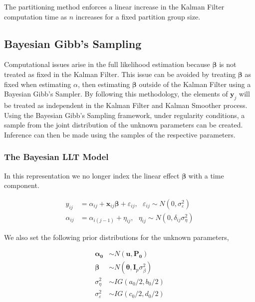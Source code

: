 \documentclass[
]{article}
\begin{document}
The partitioning method enforces a linear increase in the Kalman Filter computation time as \(n\) increases for a fixed partition group size.

\hypertarget{bayesian-gibbs-sampling}{%
\subsection{Bayesian Gibb's Sampling}\label{bayesian-gibbs-sampling}}

Computational issues arise in the full likelihood estimation because \(\boldsymbol{\beta}\) is not treated as fixed in the Kalman Filter. This issue can be avoided by treating \(\boldsymbol{\beta}\) as fixed when estimating \(\alpha\), then estimating \(\boldsymbol{\beta}\) outside of the Kalman Filter using a Bayesian Gibb's Sampler. By following this methodology, the elements of \(\boldsymbol{y}_j\) will be treated as independent in the Kalman Filter and Kalman Smoother process. Using the Bayesian Gibb's Sampling framework, under regularity conditions, a sample from the joint distribution of the unknown parameters can be created. Inference can then be made using the samples of the respective parameters.

\hypertarget{the-bayesian-llt-model}{%
\subsubsection{The Bayesian LLT Model}\label{the-bayesian-llt-model}}

In this representation we no longer index the linear effect \(\boldsymbol{\beta}\) with a time component.

\begin{equation*}
\begin{aligned}
y_{ij} &= \alpha_{ij} + \boldsymbol{x}_{ij} \boldsymbol{\beta} +\varepsilon_{ij}, \ \ \ \varepsilon_{ij} \sim N(0, \sigma^2_\varepsilon)\\
\alpha_{ij} &= \alpha_{i(j-1)} + \eta_{ij}, \ \ \ \eta_{ij}\sim N(0, \delta_{ij}\sigma^2_\eta) 
\end{aligned}
\end{equation*}

We also set the following prior distributions for the unknown parameters,

\begin{equation*}
\begin{aligned}
\boldsymbol{\alpha_0} &\sim N(\boldsymbol{u}, \boldsymbol{P_0})\\
\boldsymbol{\beta} &\sim N(\boldsymbol{\theta}, \boldsymbol{I}_p\sigma^2_\beta)\\
\sigma^2_\eta &\sim IG(a_0/2, b_0/2)\\
\sigma^2_\varepsilon &\sim IG(c_0/2,d_0/2)
\end{aligned}
\end{equation*}
\end{document}

